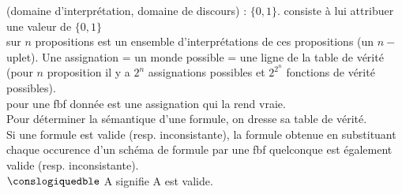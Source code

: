  (domaine d'interprétation, domaine de discours) : $\{0,1\}$.
 consiste à lui attribuer une valeur de $\{0,1\}$\\

 sur $n$ propositions est un ensemble d'interprétations de ces propositions (un $n-$uplet). Une assignation = un monde possible = une ligne de la table de vérité (pour $n$ proposition il y a $2^n$ assignations possibles et $2^{2^n}$ fonctions de vérité possibles). \\

 pour une fbf donnée est une assignation qui la rend vraie. \\

 Pour déterminer la sémantique d'une formule, on dresse sa table de vérité. \\

 Si une formule est valide (resp. inconsistante), la formule obtenue en substituant chaque occurence d'un schéma de formule par une fbf quelconque est également valide (resp. inconsistante).\\

 $\conslogiquedble$ A signifie A est valide.


